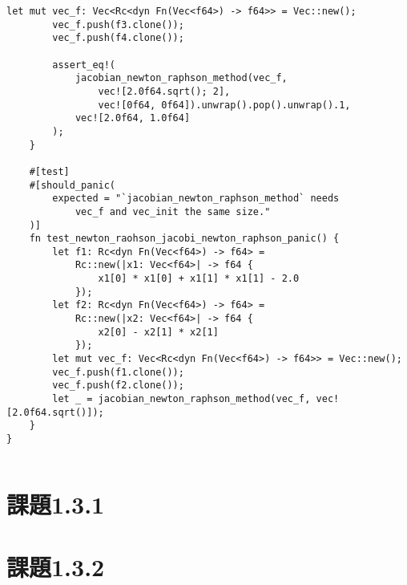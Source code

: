 \documentclass[uplatex, 11pt,a4j, titlepage]{jsarticle}
\begin{document}
\begin{lstlisting}[caption={newton\_raphson\_method.rs}]
        let mut vec_f: Vec<Rc<dyn Fn(Vec<f64>) -> f64>> = Vec::new();
        vec_f.push(f3.clone());
        vec_f.push(f4.clone());

        assert_eq!(
            jacobian_newton_raphson_method(vec_f, 
                vec![2.0f64.sqrt(); 2], 
                vec![0f64, 0f64]).unwrap().pop().unwrap().1,
            vec![2.0f64, 1.0f64]
        );
    }
    
    #[test]
    #[should_panic(
        expected = "`jacobian_newton_raphson_method` needs 
            vec_f and vec_init the same size."
    )]
    fn test_newton_raohson_jacobi_newton_raphson_panic() {
        let f1: Rc<dyn Fn(Vec<f64>) -> f64> =
            Rc::new(|x1: Vec<f64>| -> f64 { 
                x1[0] * x1[0] + x1[1] * x1[1] - 2.0 
            });
        let f2: Rc<dyn Fn(Vec<f64>) -> f64> =
            Rc::new(|x2: Vec<f64>| -> f64 { 
                x2[0] - x2[1] * x2[1] 
            });
        let mut vec_f: Vec<Rc<dyn Fn(Vec<f64>) -> f64>> = Vec::new();
        vec_f.push(f1.clone());
        vec_f.push(f2.clone());
        let _ = jacobian_newton_raphson_method(vec_f, vec![2.0f64.sqrt()]);
    }
}
\end{lstlisting}

\begin{lstlisting}[caption={matrix\_dash\_dash.rs}]

\end{lstlisting}

\section{課題1.3.1}
\section{課題1.3.2}


\newpage
\thispagestyle{empty}
\nocite{key1}
\nocite{key2}


\end{document}
